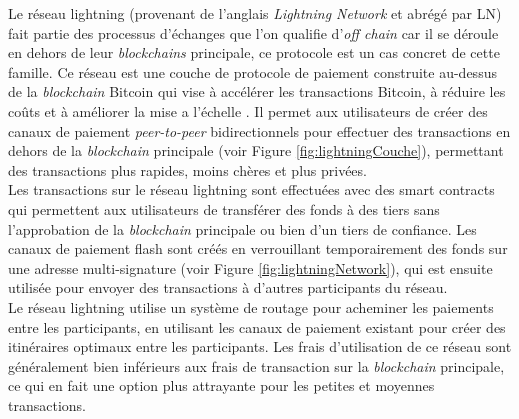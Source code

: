 Le réseau lightning (provenant de l'anglais \textit{Lightning Network} et abrégé par LN) fait partie des processus d'échanges que l'on qualifie d'\textit{\gls{off chain}} car il se déroule en dehors de leur \textit{\gls{blockchain}s} principale, ce protocole est un cas concret de cette famille.
Ce réseau est une couche de protocole de paiement construite au-dessus de la \textit{\gls{blockchain}} \gls{Bitcoin} qui vise à accélérer les transactions  \gls{Bitcoin}, à réduire les coûts et à améliorer la mise a l'échelle \cite{poon2016bitcoin}.
Il permet aux utilisateurs de créer des canaux de paiement \textit{peer-to-peer} bidirectionnels  pour effectuer des transactions en dehors de la \textit{\gls{blockchain}} principale (voir Figure \ref{fig:lightningCouche}), permettant des transactions plus rapides, moins chères et plus privées.\\
Les transactions sur le réseau lightning sont effectuées avec des \gls{smart contract}s qui permettent aux utilisateurs de transférer des fonds à des tiers sans l'approbation de la \textit{\gls{blockchain}} principale ou bien d'un tiers de confiance. 
Les canaux de paiement flash sont créés en verrouillant temporairement des fonds sur une adresse multi-signature (voir Figure \ref{fig:lightningNetwork}), qui est ensuite utilisée pour envoyer des transactions à d'autres participants du réseau.\\ 
Le réseau lightning utilise un système de routage pour acheminer les paiements entre les participants, en utilisant les canaux de paiement existant pour créer des itinéraires optimaux entre les participants. 
Les frais d'utilisation de ce réseau sont généralement bien inférieurs aux frais de transaction sur la \textit{\gls{blockchain}} principale, ce qui en fait une option plus attrayante pour les  petites et moyennes transactions.

